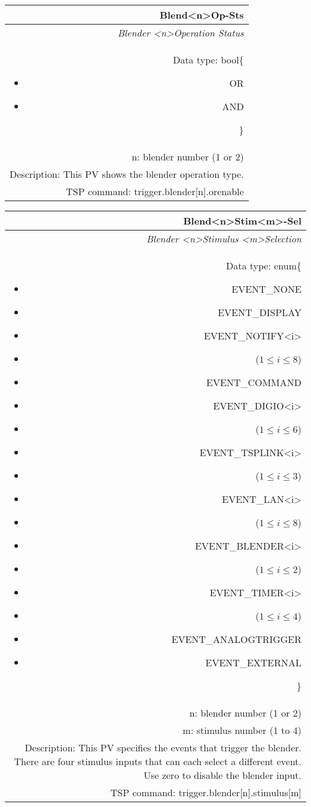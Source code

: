 \documentclass[openany]{article}
\begin{document}
		\begin{tabular}{N}
			\hline
			\bfseries Blend{\textless n\textgreater}Op-Sts\label{pv:blendop-sts} \\ \hline
			\emph{Blender \textless n\textgreater Operation Status} \\
			Data type: bool\{\begin{itemize}[noitemsep]
				\small
				\item[] OR
				\item[] AND
			\end{itemize}\} \\
			n: blender number (1 or 2) \\
			Description: This PV shows the blender operation type. \\
			TSP command: trigger.blender[n].orenable
		\end{tabular}

		\begin{tabular}{N}
			\hline
			\bfseries Blend{\textless n\textgreater}Stim{\textless m\textgreater}-Sel\label{pv:blendstim-sel} \\ \hline
			\emph{Blender \textless n\textgreater Stimulus \textless m\textgreater Selection} \\
			Data type: enum\{\begin{itemize}[noitemsep]
				\small
				\item[] EVENT\_NONE
				\item[] EVENT\_DISPLAY
				\item[] EVENT\_NOTIFY\textless i\textgreater
				\item[] ($1\leq i\leq 8$)
				\item[] EVENT\_COMMAND
				\item[] EVENT\_DIGIO\textless i\textgreater
				\item[] ($1\leq i\leq 6$)
				\item[] EVENT\_TSPLINK\textless i\textgreater
				\item[] ($1\leq i\leq 3$)
				\item[] EVENT\_LAN\textless i\textgreater
				\item[] ($1\leq i\leq 8$)
				\item[] EVENT\_BLENDER\textless i\textgreater 
				\item[] ($1\leq i\leq 2$)
				\item[] EVENT\_TIMER\textless i\textgreater
				\item[] ($1\leq i\leq 4$)
				\item[] EVENT\_ANALOGTRIGGER
				\item[] EVENT\_EXTERNAL
			\end{itemize}\} \\
			n: blender number (1 or 2) \\
			m: stimulus number (1 to 4) \\
			Description: This PV specifies the events that trigger the blender. There are four stimulus inputs that can each select a different event. Use zero to disable the blender input. \\
			TSP command: trigger.blender[n].stimulus[m]
		\end{tabular}
\end{document}
